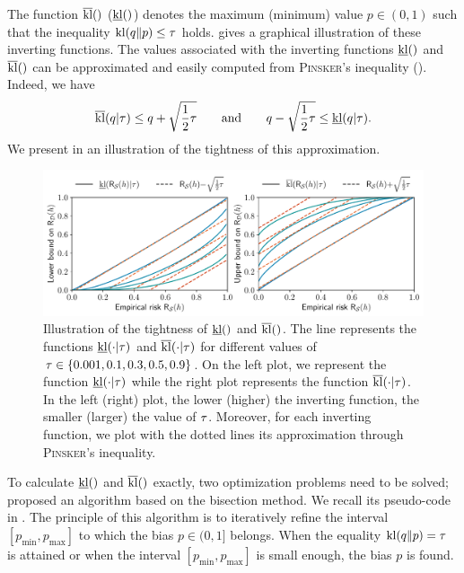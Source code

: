 The function $\overline{\operatorname{kl}}()$ (\resp $\underline{\operatorname{kl}}()$) denotes the maximum (\resp minimum) value $p\in(0,1)$ such that the inequality $\operatorname{kl}(q\|p) \le \tau$ holds.
 gives a graphical illustration of these inverting functions.
The values associated with the inverting functions $\underline{\operatorname{kl}}()$ and $\overline{\operatorname{kl}}()$ can be approximated and easily computed from \textsc{Pinsker}'s inequality ().
Indeed, we have
\begin{align}
    \overline{\operatorname{kl}}(q|\tau) \le q + \sqrt{\frac{1}{2}\tau} \qquad\text{and}\qquad q - \sqrt{\frac{1}{2}\tau} \le \underline{\operatorname{kl}}(q|\tau).\label{chap:pac-bayes:eq:kl-approx}
\end{align}
We present in  an illustration of the tightness of this approximation.

\begin{figure}[t]
    \centering
    \includegraphics[width=\textwidth]{chapter_2/figures/invert_kl_pinsker.pdf}
    \caption[Illustration of the Tightness of $\klmin$ and $\klmax$]{%
    Illustration of the tightness of $\underline{\operatorname{kl}}()$ and $\overline{\operatorname{kl}}()$.
    The line represents the functions $\underline{\operatorname{kl}}(\cdot|\tau)$ and $\overline{\operatorname{kl}}(\cdot|\tau)$ for different values of $\tau\in\{0.001, 0.1, 0.3, 0.5, 0.9\}$.
    On the left plot, we represent the function $\underline{\operatorname{kl}}(\cdot|\tau)$ while the right plot represents the function $\overline{\operatorname{kl}}(\cdot|\tau)$. 
    In the left (\resp right) plot, the lower (\resp higher) the inverting function, the smaller (\resp larger) the value of $\tau$.
    Moreover, for each inverting function, we plot with the dotted lines its approximation through \textsc{Pinsker}'s inequality.
    }
    \label{chap:pac-bayes:fig:invert-kl-pinsker}
\end{figure}

To calculate $\underline{\operatorname{kl}}()$ and $\overline{\operatorname{kl}}()$ exactly, two optimization problems need to be solved; \citet{ReebDoerrGerwinnRakitsch2018} proposed an algorithm based on the bisection method.
We recall its pseudo-code in . 
The principle of this algorithm is to iteratively refine the interval $[p_{\text{min}}, p_{\text{max}}]$ to which the bias $p\in(0,1]$ belongs.
When the equality $\operatorname{kl}(q\|p)=\tau$ is attained or when the interval $[p_{\text{min}}, p_{\text{max}}]$ is small enough, the bias $p$ is found.

